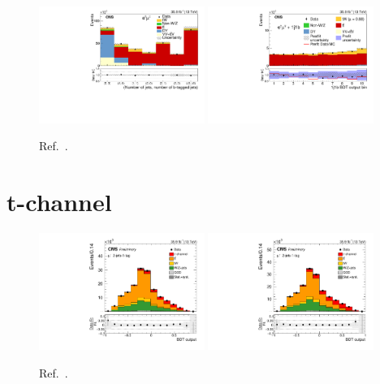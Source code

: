 \documentclass{PoS}
\begin{document}
\begin{figure}[!htb]
\begin{center}
\includegraphics[width=0.48\textwidth]{tw1.pdf}\hspace{0.02\textwidth}
\includegraphics[width=0.48\textwidth]{tw2.pdf}
\caption{\label{fig:tw-channel-bdt}Ref.~.}
\end{center}
\end{figure}

\section{t-channel}

\begin{figure}[!htb]
\begin{center}
\includegraphics[width=0.48\textwidth]{tch1.pdf}\hspace{0.02\textwidth}
\includegraphics[width=0.48\textwidth]{tch2.pdf}
\caption{\label{fig:t-channel-bdt}Ref.~.}
\end{center}
\end{figure}
\end{document}
